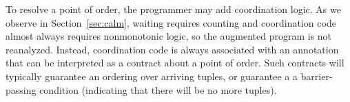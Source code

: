 To resolve a point of order, the programmer may add coordination logic.
As we observe in Section~\ref{sec:calm}, waiting requires counting and coordination code almost always 
requires nonmonotonic logic, so the augmented program is not reanalyzed.
Instead, coordination code is always associated with an annotation that can
be interpreted as a contract about a point of order.  Such contracts will
typically guarantee an ordering over arriving tuples, or guarantee a 
a barrier-passing condition (indicating that there will be no more tuples).

